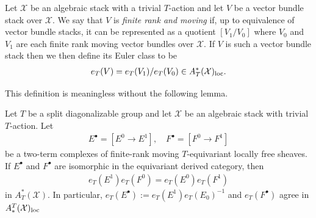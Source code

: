\documentclass[12pt,dvipsnames]{amsart}
\begin{document}
\begin{definition}\label{rl-000T}\label{defn:euler-class-of-vector-bundle-stack}
  Let \(\mathcal X\) be an algebraic stack with a trivial \(T\)-action and let $V$ be a vector bundle stack over $\mathcal X$. We say that \(V\) is \emph{finite rank and moving} if, up to equivalence of vector bundle stacks, it can be represented as a quotient \([V_1/V_0]\) where \(V_0\) and \(V_1\) are each finite rank moving vector bundles over \(\mathcal X\). If \(V\) is such a vector bundle stack then we then define its Euler class to be
  \begin{align*}
    e_T(V) = e_T(V_1)/e_T(V_0) \in A^*_T(\mathcal X)_{\operatorname{loc}}.
  \end{align*}
\end{definition}

This definition is meaningless without the following lemma.

\begin{lemma}\label{rl-000U}\label{lem:euler-class-well-defined}
  Let \(T\) be a split diagonalizable group and let \(\mathcal X\) be an algebraic stack with trivial \(T\)-action. Let
  \begin{align*}
    E^\bullet = [E^0 \to E^1], \hspace{1em} F^\bullet = [F^0 \to F^1]
  \end{align*}
  be a two-term complexes of finite-rank moving \(T\)-equivariant locally free sheaves. If \(E^\bullet\) and \(F^\bullet\) are isomorphic in the equivariant derived category, then
  \begin{align*}
    e_T(E^1)e_T(F^0) = e_T(E^0)e_T(F^1)
  \end{align*}
  in \(A^*_T(\mathcal X)\). In particular, \(e_T(E^\bullet) := e_T(E^1)e_T(E_0)^{-1}\) and \(e_T(F^\bullet)\) agree in \(A_*^T(\mathcal X)_{\operatorname{loc}}\)
\end{lemma}
\end{document}
